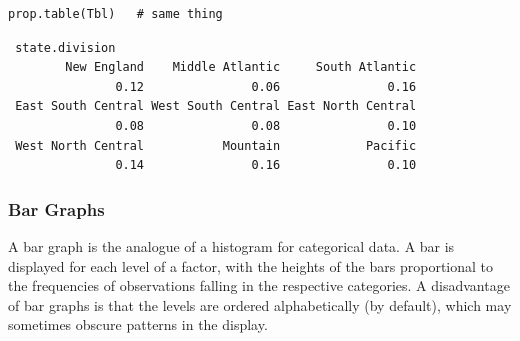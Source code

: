 \documentclass[captions=tableheading]{scrbook}
\begin{document}
\lstset{language=R}
\begin{lstlisting}
prop.table(Tbl)   # same thing
\end{lstlisting}

\begin{verbatim}
 state.division
        New England    Middle Atlantic     South Atlantic 
               0.12               0.06               0.16 
 East South Central West South Central East North Central 
               0.08               0.08               0.10 
 West North Central           Mountain            Pacific 
               0.14               0.16               0.10
\end{verbatim}
\subsubsection{Bar Graphs}
\label{sec-3-1-4-2}
\label{par:Bar-Graphs}


A bar graph is the analogue of a histogram for categorical data. A bar is displayed for each level of a factor, with the heights of the bars proportional to the frequencies of observations falling in the respective categories. A disadvantage of bar graphs is that the levels are ordered alphabetically (by default), which may sometimes obscure patterns in the display. 
\end{document}
